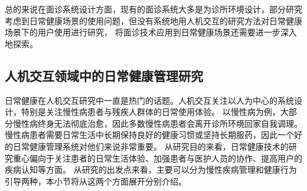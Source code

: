 
总的来说在面诊系统设计方面，现有的面诊系统大多是为诊所环境设计，部分研究考虑到日常健康场景的使用问题，但没有系统地用人机交互的研究方法对日常健康场景下的用户使用进行研究，
将面诊技术应用到日常健康场景还需要进一步深入地探索。

\subsection{人机交互领域中的日常健康管理研究}

日常健康在人机交互研究中一直是热门的话题。人机交互关注以人为中心的系统设计，特别是关注慢性病患者与残疾人群体的日常使用体验。
以慢性病为例，大部分慢性病终身无法彻底治愈，因此多数慢性病患者会离开诊所环境回家自我调理。
慢性病患者需要日常生活中长期保持良好的健康习惯或坚持长期服药，因此一个好的日常健康管理系统对他们来说非常重要。
从研究目的来看，日常健康技术的研究重心偏向于关注患者的日常生活体验、加强患者与医护人员的协作、提高用户的疾病认知等方面\cite{nunes2015self-care}。
从研究的出发点来看，主要可以分为慢性疾病管理和健康行为引导两种\cite{nunes2015self-care}，本小节将从这两个方面展开分别介绍。

